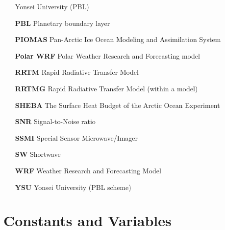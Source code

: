 \begin{enumerate}
    \hspace*{3.3cm} Yonsei University (PBL)
    \item[\textbf{PBL}] Planetary boundary layer
    \item[\textbf{PIOMAS}] Pan-Arctic Ice Ocean Modeling and Assimilation System
    \item[\textbf{Polar WRF}] Polar Weather Research and Forecasting model
    \item[\textbf{RRTM}] Rapid Radiative Transfer Model
    \item[\textbf{RRTMG}] Rapid Radiative Transfer Model (within a model)
    \item[\textbf{SHEBA}] The Surface Heat Budget of the Arctic Ocean Experiment
    \item[\textbf{SNR}] Signal-to-Noise ratio
    \item[\textbf{SSMI}] Special Sensor Microwave/Imager
    \item[\textbf{SW}] Shortwave
    \item[\textbf{WRF}] Weather Research and Forecasting Model
    \item[\textbf{YSU}] Yonsei University (PBL scheme)
\end{enumerate}
\section{Constants and Variables}
